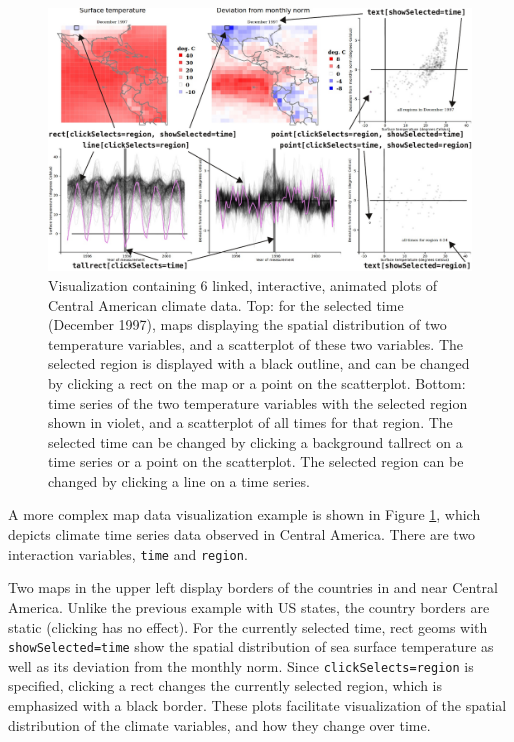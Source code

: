 \documentclass[12pt,]{article}
\theoremstyle{definition}
\theoremstyle{definition}
\theoremstyle{definition}
\theoremstyle{remark}
\begin{document}
\begin{figure}
\centering
\includegraphics{images/figure-climate}
\caption{\label{fig:climate}Visualization containing 6 linked, interactive,
animated plots of Central American climate data. Top: for the selected
time (December 1997), maps displaying the spatial distribution of two
temperature variables, and a scatterplot of these two variables. The
selected region is displayed with a black outline, and can be changed by
clicking a rect on the map or a point on the scatterplot. Bottom: time
series of the two temperature variables with the selected region shown
in violet, and a scatterplot of all times for that region. The selected
time can be changed by clicking a background tallrect on a time series
or a point on the scatterplot. The selected region can be changed by
clicking a line on a time series.}
\end{figure}

A more complex map data visualization example is shown in Figure
\ref{fig:climate}, which depicts climate time series data observed in
Central America. There are two interaction variables, \texttt{time} and
\texttt{region}.

Two maps in the upper left display borders of the countries in and near
Central America. Unlike the previous example with US states, the country
borders are static (clicking has no effect). For the currently selected
time, rect geoms with \texttt{showSelected=time} show the spatial
distribution of sea surface temperature as well as its deviation from
the monthly norm. Since \texttt{clickSelects=region} is specified,
clicking a rect changes the currently selected region, which is
emphasized with a black border. These plots facilitate visualization of
the spatial distribution of the climate variables, and how they change
over time.
\end{document}

